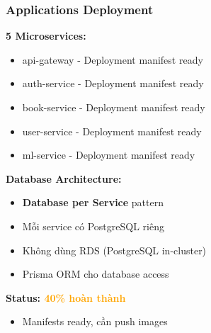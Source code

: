 \documentclass[aspectratio=169]{beamer}
\begin{document}
\begin{frame}
\frametitle{Applications Deployment}
\textbf{5 Microservices:}
\begin{itemize}
    \item[$\checkmark$] api-gateway - Deployment manifest ready
    \item[$\checkmark$] auth-service - Deployment manifest ready
    \item[$\checkmark$] book-service - Deployment manifest ready
    \item[$\checkmark$] user-service - Deployment manifest ready
    \item[$\checkmark$] ml-service - Deployment manifest ready
\end{itemize}

\vspace{0.3cm}
\textbf{Database Architecture:}
\begin{itemize}
    \item[$\checkmark$] \textbf{Database per Service} pattern
    \item[$\checkmark$] Mỗi service có PostgreSQL riêng
    \item[$\checkmark$] Không dùng RDS (PostgreSQL in-cluster)
    \item[$\checkmark$] Prisma ORM cho database access
\end{itemize}

\vspace{0.3cm}
\textbf{Status: \textcolor{orange}{40\% hoàn thành}}
\begin{itemize}
    \item[$\sim$] Manifests ready, cần push images
\end{itemize}
\end{frame}
\end{document}
